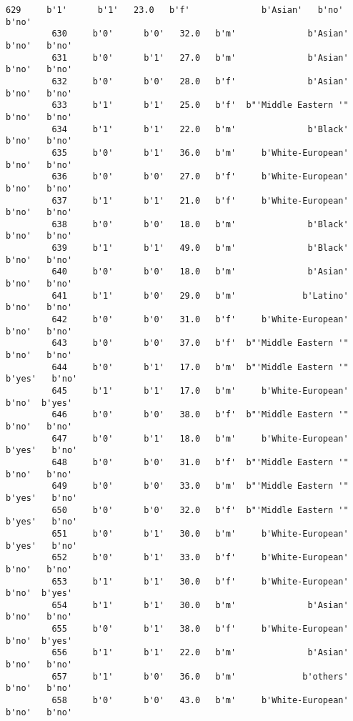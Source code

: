 \documentclass[11pt]{article}
\begin{document}
\begin{Verbatim}[commandchars=\\\{\}]
         629     b'1'      b'1'   23.0   b'f'              b'Asian'   b'no'   b'no'   
         630     b'0'      b'0'   32.0   b'm'              b'Asian'   b'no'   b'no'   
         631     b'0'      b'1'   27.0   b'm'              b'Asian'   b'no'   b'no'   
         632     b'0'      b'0'   28.0   b'f'              b'Asian'   b'no'   b'no'   
         633     b'1'      b'1'   25.0   b'f'  b"'Middle Eastern '"   b'no'   b'no'   
         634     b'1'      b'1'   22.0   b'm'              b'Black'   b'no'   b'no'   
         635     b'0'      b'1'   36.0   b'm'     b'White-European'   b'no'   b'no'   
         636     b'0'      b'0'   27.0   b'f'     b'White-European'   b'no'   b'no'   
         637     b'1'      b'1'   21.0   b'f'     b'White-European'   b'no'   b'no'   
         638     b'0'      b'0'   18.0   b'm'              b'Black'   b'no'   b'no'   
         639     b'1'      b'1'   49.0   b'm'              b'Black'   b'no'   b'no'   
         640     b'0'      b'0'   18.0   b'm'              b'Asian'   b'no'   b'no'   
         641     b'1'      b'0'   29.0   b'm'             b'Latino'   b'no'   b'no'   
         642     b'0'      b'0'   31.0   b'f'     b'White-European'   b'no'   b'no'   
         643     b'0'      b'0'   37.0   b'f'  b"'Middle Eastern '"   b'no'   b'no'   
         644     b'0'      b'1'   17.0   b'm'  b"'Middle Eastern '"  b'yes'   b'no'   
         645     b'1'      b'1'   17.0   b'm'     b'White-European'   b'no'  b'yes'   
         646     b'0'      b'0'   38.0   b'f'  b"'Middle Eastern '"   b'no'   b'no'   
         647     b'0'      b'1'   18.0   b'm'     b'White-European'  b'yes'   b'no'   
         648     b'0'      b'0'   31.0   b'f'  b"'Middle Eastern '"   b'no'   b'no'   
         649     b'0'      b'0'   33.0   b'm'  b"'Middle Eastern '"  b'yes'   b'no'   
         650     b'0'      b'0'   32.0   b'f'  b"'Middle Eastern '"  b'yes'   b'no'   
         651     b'0'      b'1'   30.0   b'm'     b'White-European'  b'yes'   b'no'   
         652     b'0'      b'1'   33.0   b'f'     b'White-European'   b'no'   b'no'   
         653     b'1'      b'1'   30.0   b'f'     b'White-European'   b'no'  b'yes'   
         654     b'1'      b'1'   30.0   b'm'              b'Asian'   b'no'   b'no'   
         655     b'0'      b'1'   38.0   b'f'     b'White-European'   b'no'  b'yes'   
         656     b'1'      b'1'   22.0   b'm'              b'Asian'   b'no'   b'no'   
         657     b'1'      b'0'   36.0   b'm'             b'others'   b'no'   b'no'   
         658     b'0'      b'0'   43.0   b'm'     b'White-European'   b'no'   b'no'   

\end{Verbatim}
\end{document}
